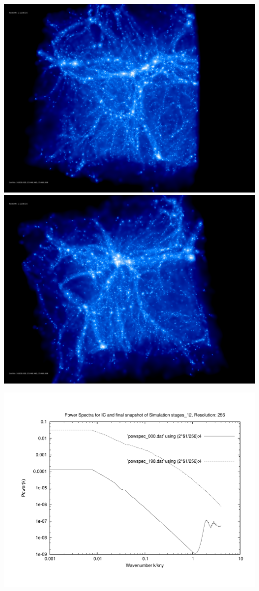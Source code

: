 \includegraphics[scale=0.1]{r256/stages_12/rotate_00074.jpg} 
\includegraphics[scale=0.1]{r256/stages_12/rotate_00131.jpg}

\includegraphics[scale=0.5]{r256/stages_12/plot_powspec_stages_12}

